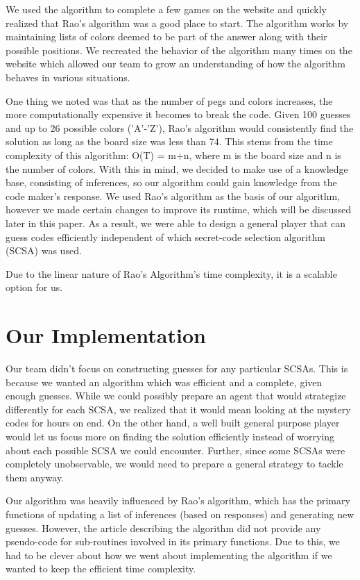 \documentclass[11pt]{article}
\begin{document}
    We used the algorithm to complete a few games on the website and quickly realized that Rao's algorithm was a good place to start. The algorithm works by maintaining lists of colors deemed to be part of the answer along with their possible positions. We recreated the behavior of the algorithm many times on the website\autocite{webgames} which allowed our team to grow an understanding of how the algorithm behaves in various situations.

    One thing we noted was that as the number of pegs and colors increases, the more computationally expensive it becomes to break the code. Given 100 guesses and up to 26 possible colors ('A'-'Z'), Rao’s algorithm would consistently find the solution as long as the board size was less than 74. This stems from the time complexity of this algorithm: O(T) = m+n, where m is the board size and n is the number of colors. With this in mind, we decided to make use of a knowledge base, consisting of inferences, so our algorithm could gain knowledge from the code maker’s response. We used Rao’s algorithm as the basis of our algorithm, however we made certain changes to improve its runtime, which will be discussed later in this paper. As a result, we were able to design a general player that can guess codes efficiently independent of which secret-code selection algorithm (SCSA) was used.

    Due to the linear nature of Rao's Algorithm's time complexity, it is a scalable option for us.

    \section{Our Implementation}

    Our team didn’t focus on constructing guesses for any particular SCSAs. This is because we wanted an algorithm which was efficient and a complete, given enough guesses. While we could possibly prepare an agent that would strategize differently for each SCSA, we realized that it would mean looking at the mystery codes for hours on end. On the other hand, a well built general purpose player would let us focus more on finding the solution efficiently instead of worrying about each possible SCSA we could encounter. Further, since some SCSAs were completely unobservable, we would need to prepare a general strategy to tackle them anyway.

    Our algorithm was heavily influenced by Rao’s algorithm, which has the primary functions of updating a list of inferences (based on responses) and generating new guesses. However, the article describing the algorithm did not provide any pseudo-code for sub-routines involved in its primary functions. Due to this, we had to be clever about how we went about implementing the algorithm if we wanted to keep the efficient time complexity. 
    
\end{document}
